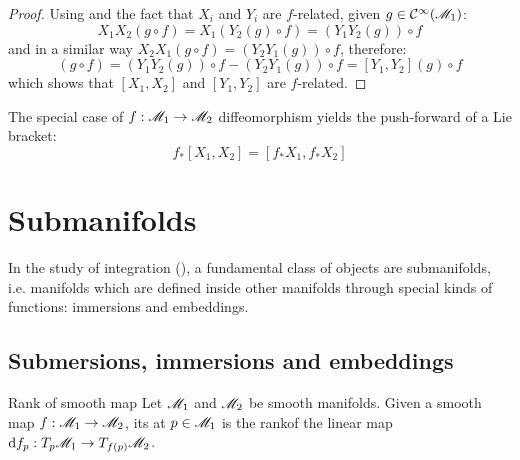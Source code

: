 \begin{proofbox}
  \begin{proof}
    Using  and the fact that $ X_i $ and $ Y_i $ are $ f $-related, given $ g \in \mathcal{C}^{\infty}(\mathscr{M}_1) $:
    \begin{equation*}
      X_1 X_2 (g \circ f) = X_1 (Y_2(g) \circ f) = (Y_1 Y_2(g)) \circ f
    \end{equation*}
    and in a similar way $ X_2 X_1 (g \circ f) = (Y_2 Y_1(g)) \circ f $, therefore:
    \begin{equation*}
      [X_1 , X_2](g \circ f) = (Y_1 Y_2(g)) \circ f - (Y_2 Y_1(g)) \circ f = [Y_1 , Y_2](g) \circ f
    \end{equation*}
    which shows that $ [X_1 , X_2] $ and $ [Y_1 , Y_2] $ are $ f $-related.
  \end{proof}
\end{proofbox}

The special case of $ f : \mathscr{M}_1 \rightarrow \mathscr{M}_2 $ diffeomorphism yields the push-forward of a Lie bracket:
\begin{equation}
  f_* [X_1 , X_2] = [f_* X_1 , f_* X_2]
\end{equation}

\section{Submanifolds}

In the study of integration (), a fundamental class of objects are submanifolds, i.e. manifolds which are defined inside other manifolds through special kinds of functions: immersions and embeddings.

\subsection{Submersions, immersions and embeddings}

\begin{definition}{Rank of smooth map}{}
  Let $ \mathscr{M}_1 $ and $ \mathscr{M}_2 $ be smooth manifolds. Given a smooth map $ f : \mathscr{M}_1 \rightarrow \mathscr{M}_2 $, its  at $ p \in \mathscr{M}_1 $ is the rank\footnotemark of the linear map $ \mathrm{d} f_p : T_p\mathscr{M}_1 \rightarrow T_{f(p)}\mathscr{M}_2 $.
\end{definition}


